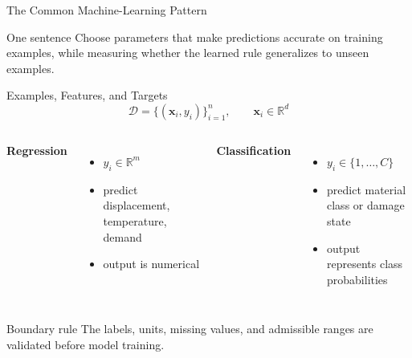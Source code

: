 \documentclass[10pt,aspectratio=169]{ntuabeamer}
\begin{document}
\begin{frame}{The Common Machine-Learning Pattern}
  \begin{center}
  \end{center}
  \begin{block}{One sentence}
    Choose parameters that make predictions accurate on training examples, while measuring whether the learned rule generalizes to unseen examples.
  \end{block}
\end{frame}

\begin{frame}{Examples, Features, and Targets}
  \[
    \mathcal D=\{(\mathbf x_i,y_i)\}_{i=1}^{n},
    \qquad \mathbf x_i\in\mathbb R^d
  \]
  \begin{columns}[T]
    \textcolor{softblue}{\textbf{Regression}}
    \begin{itemize}
      \item $y_i\in\mathbb R^m$
      \item predict displacement, temperature, demand
      \item output is numerical
    \end{itemize}
    \textcolor{softteal}{\textbf{Classification}}
    \begin{itemize}
      \item $y_i\in\{1,\ldots,C\}$
      \item predict material class or damage state
      \item output represents class probabilities
    \end{itemize}
  \end{columns}
  \vspace{0.25cm}
  \begin{alertblock}{Boundary rule}
    The labels, units, missing values, and admissible ranges are validated before model training.
  \end{alertblock}
\end{frame}
\end{document}
